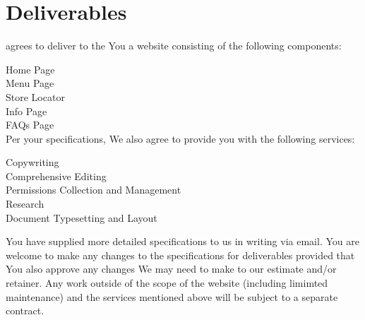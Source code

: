 \documentclass[usletter,11pt]{article} %
\renewcommand{\companyname}{} %
\renewcommand{\preparer}{} %
\renewcommand{\companyaddress}{} %
\renewcommand{\companyphone}{} %
\renewcommand{\companywebsite}{} %
\renewcommand{\companyGithub}{} %
\renewcommand{\clientbusinessname}{[Client's Business Name]} %
\renewcommand{\contracttitle}{} %
\begin{document}
\begin{titlepage}

\vspace*{\fill} %

\begin{center}

{\huge \textbf{\companyname}}

{\Large \contracttitle}

\small{with}

{\LARGE\textbf{\clientbusinessname}\\

\vspace{5ex}
Prepared: \today\\
\vspace{2ex}
\small{by}\\
\vspace{2ex}
\preparer\\
\vspace{2ex}

\companyaddress

\companyphone
\companywebsite
\companyGithub

\end{center}

\vspace*{\fill} %

\end{titlepage}
\preamble
\section{Deliverables}

\companyname agrees to deliver to the You a website consisting of the following components:

Home Page\\
Menu Page\\
Store Locator\\
Info Page\\
FAQs Page\\

Per your specifications, We also agree to provide you with the following services:

Copywriting\\
Comprehensive Editing\\
Permissions Collection and Management\\
Research\\
\latex Document Typesetting and Layout

You have supplied more detailed specifications to us in writing via email. You are welcome to make any changes to the specifications for deliverables provided that You also approve any changes We may need to make to our estimate and/or retainer. Any work outside of the scope of the website (including limimted maintenance) and the services mentioned above will be subject to a separate contract.
\end{document}
